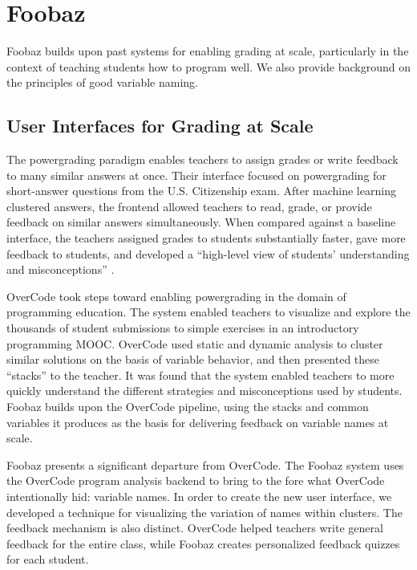 \section{Foobaz}
Foobaz builds upon past systems for enabling grading at scale, particularly in the context of teaching students how to program well. We also provide background on the principles of good variable naming.


\subsection{User Interfaces for Grading at Scale}
The powergrading paradigm \cite{basupowergrading} enables teachers to assign grades or write feedback to many similar answers at once. Their interface focused on powergrading for short-answer questions from the U.S. Citizenship exam. After machine learning clustered answers, the frontend allowed teachers to read, grade, or provide feedback on similar answers simultaneously. When compared against a baseline interface, the teachers assigned grades to students substantially faster, gave more feedback to students, and developed a ``high-level view of students' understanding and misconceptions'' \cite{basuDivideAndConquer}.

OverCode \cite{overcode} took steps toward enabling powergrading in the domain of programming education. The system enabled teachers to visualize and explore the thousands of student submissions to simple exercises in an introductory programming MOOC. OverCode used static and dynamic analysis to cluster similar solutions on the basis of variable behavior, and then presented these ``stacks'' to the teacher. It was found that the system enabled teachers to more quickly understand the different strategies and misconceptions used by students. Foobaz builds upon the OverCode pipeline, using the stacks and common variables it produces as the basis for delivering feedback on variable names at scale.

Foobaz presents a significant departure from OverCode. The Foobaz system uses the OverCode program analysis backend to bring to the fore what OverCode intentionally hid: variable names. In order to create the new user interface, we developed a technique for visualizing the variation of names within clusters. The feedback mechanism is also distinct. OverCode helped teachers write general feedback for the entire class, while Foobaz creates personalized feedback quizzes for each student.

